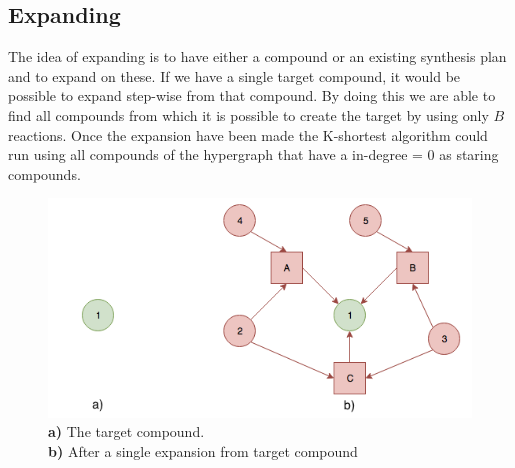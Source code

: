 \documentclass[a4paper,10pt,titlepage]{paper}
\begin{document}
\subsection{Expanding}
The idea of expanding is to have either a compound or an existing synthesis plan and to expand on these. If we have a single target compound, it would be possible to expand step-wise from that compound. By doing this we are able to find all compounds from which it is possible to create the target by using only $B$ reactions. Once the expansion have been made the K-shortest algorithm could run using all compounds of the hypergraph that have a in-degree = 0 as staring compounds.
\begin{figure}[H]
\centering
\includegraphics[scale=0.5]{Billeder/TestOfExpansion1.png}
\caption{\textbf{a)} The target compound. \\ \textbf{b)} After a single expansion from target compound}
\end{figure} 
\end{document}
